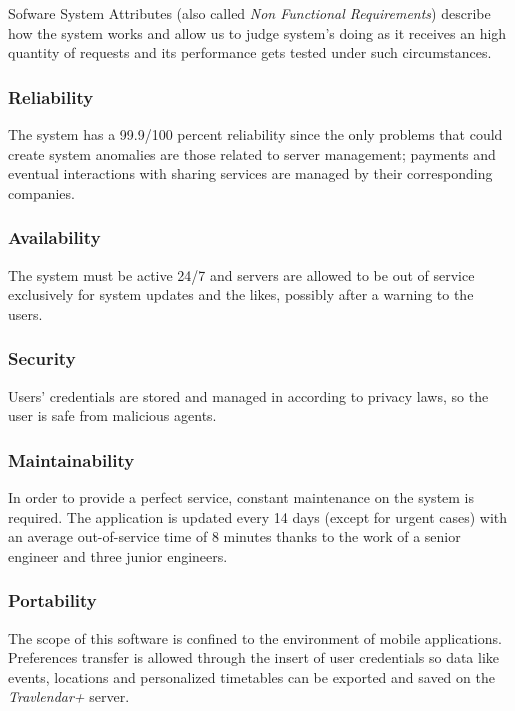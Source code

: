 Sofware System Attributes (also called \textit{Non Functional Requirements}) describe how the system works and allow us to judge system's doing as it receives an high quantity of requests and its performance gets tested under such circumstances.

\subsubsection{Reliability}
	The system has a 99.9/100 percent reliability since the only problems that could create system anomalies are those related to server management; payments and eventual interactions with sharing services are managed by their corresponding companies.

\subsubsection{Availability}
	The system must be active 24/7 and servers are allowed to be out of service exclusively for system updates and the likes, possibly after a  warning to the users.

\subsubsection{Security}
	Users' credentials are stored and managed in according to privacy laws, so the user is safe from malicious agents.

\subsubsection{Maintainability}
	In order to provide a perfect service, constant maintenance on the system is required. The application is updated every 14 days (except for urgent cases) with an average out-of-service time of 8 minutes thanks to the work of a senior engineer and three junior engineers.

\subsubsection{Portability}
	The scope of this software is confined to the environment of mobile applications. Preferences transfer is allowed through the insert of user credentials so data like events, locations and personalized timetables can be exported and saved on the \textit{Travlendar+} server.
